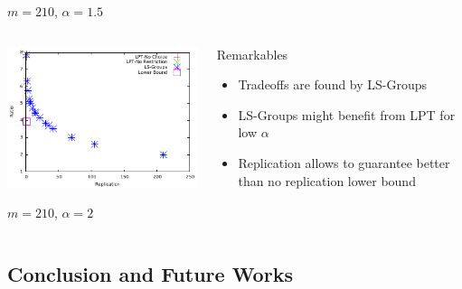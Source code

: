 \documentclass[usenames,dvipsnames]{beamer}
\begin{document}
\begin{frame}
\begin{columns}
\begin{center}
      {\footnotesize $m=210$, $\alpha=1.5$}
    \end{center}
    
  \end{columns}

  \vspace{-1.1em}

  \begin{columns}
    
    \begin{center}
      \includegraphics[width=\textwidth]{figs/alpha_2.pdf}
  
      {\footnotesize $m=210$, $\alpha=2$}
    \end{center}

    \begin{block}{Remarkables}
      \begin{itemize}
      \item Tradeoffs are found by LS-Groups
      \item LS-Groups might benefit from LPT for low $\alpha$
      \item Replication allows to guarantee better than no replication lower bound
      \end{itemize}
    \end{block}
  \end{columns}
  
\end{frame}

\subsection{Conclusion and Future Works}
\end{document}
